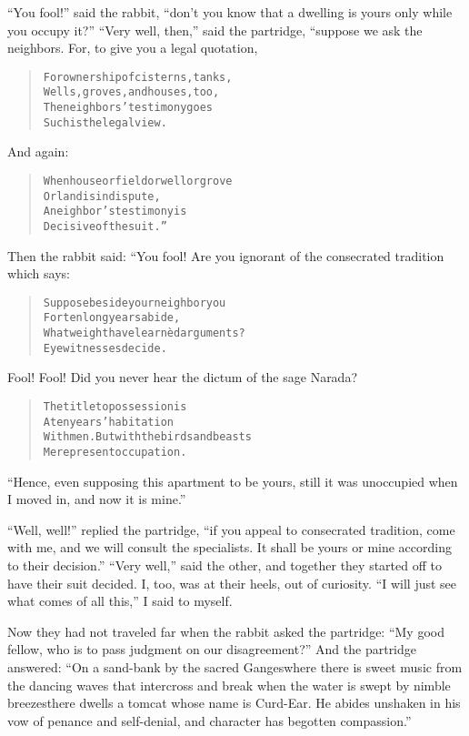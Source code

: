 \documentclass[article, twoside, 14pt]{memoir}
\renewenvironment{verbatim}{%
\begin{quote}%
\vskip -10pt%
\begin{alltt}\normalfont\large}{\end{alltt}%
\end{quote}%
\vskip -10pt
} %
\begin{document}
``You fool!'' said the rabbit,
``don't you know that a dwelling is yours only while you occupy it?''
``Very well, then,'' said the partridge, “suppose we ask the
neighbors. For, to give you a legal quotation,

\begin{verbatim}
For ownership of cisterns, tanks,
    Wells, groves, and houses, too,
The neighbors' testimony goes{\textemdash}
    Such is the legal view.
\end{verbatim}
And again:

\begin{verbatim}
When house or field or well or grove
    Or land is in dispute,
A neighbor's testimony is
    Decisive of the suit.”
\end{verbatim}
Then the rabbit said: “You fool! Are you ignorant of the
consecrated tradition which says:

\begin{verbatim}
Suppose beside your neighbor you
    For ten long years abide,
What weight have learnèd arguments?
    Eyewitnesses decide.
\end{verbatim}
Fool! Fool! Did you never hear the dictum of the sage Narada?

\begin{verbatim}
The title to possession is
    A ten years' habitation
With men. But with the birds and beasts
    Mere present occupation.
\end{verbatim}
``Hence, even supposing this apartment to be yours, still it was unoccupied when I moved in, and now it is mine.''

``Well, well!'' replied the partridge,
``if you appeal to consecrated tradition, come with me, and we will consult the specialists. It shall be yours or mine according to their decision.''
``Very well,'' said the other, and together they started off to
have their suit decided. I, too, was at their heels, out of
curiosity. ``I will just see what comes of all this,'' I said to
myself.

Now they had not traveled far when the rabbit asked the partridge:
``My good fellow, who is to pass judgment on our disagreement?''
And the partridge answered:
``On a sand-bank by the sacred Ganges{\textemdash}where there is sweet music from the dancing waves that intercross and break when the water is swept by nimble breezes{\textemdash}there dwells a tomcat whose name is Curd-Ear. He abides unshaken in his vow of penance and self-denial, and character has begotten compassion.''
\end{document}
